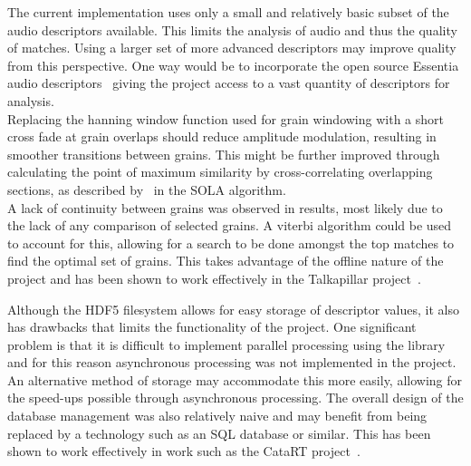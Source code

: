 \documentclass{scrartcl}
\begin{document}
    The current implementation uses only a small and relatively basic subset of
    the audio descriptors available. This limits the analysis of audio and thus
    the quality of matches. Using a larger set of more advanced descriptors may
    improve quality from this perspective. One way would be to incorporate the
    open source Essentia audio descriptors~\parencite{Essentia2016} giving the
    project access to a vast quantity of descriptors for analysis.\\

    Replacing the hanning window function used for grain windowing with a short
    cross fade at grain overlaps should reduce amplitude modulation, resulting
    in smoother transitions between grains. This might be further improved
    through calculating the point of maximum similarity by cross-correlating
    overlapping sections, as described by~\textcite[p.191-193]{Zolzer2011} in
    the SOLA algorithm.\\

    A lack of continuity between grains was observed in results, most likely
    due to the lack of any comparison of selected grains. A viterbi algorithm
    could be used to account for this, allowing for a search to be done amongst
    the top matches to find the optimal set of grains. This takes advantage of
    the offline nature of the project and has been shown to work effectively in
    the Talkapillar project~\parencite{Hueber}.

    Although the HDF5 filesystem allows for easy storage of descriptor values,
    it also has drawbacks that limits the functionality of the project. One
    significant problem is that it is difficult to implement parallel
    processing using the library and for this reason asynchronous processing was
    not implemented in the project. An alternative method of storage may
    accommodate this more easily, allowing for the speed-ups possible through
    asynchronous processing. The overall design of the database management was
    also relatively naive and may benefit from being replaced by a technology
    such as an SQL database or similar. This has been shown to work effectively
    in work such as the CataRT project~\parencite[p.3]{Schwarz2006a}.
    
\end{document}
